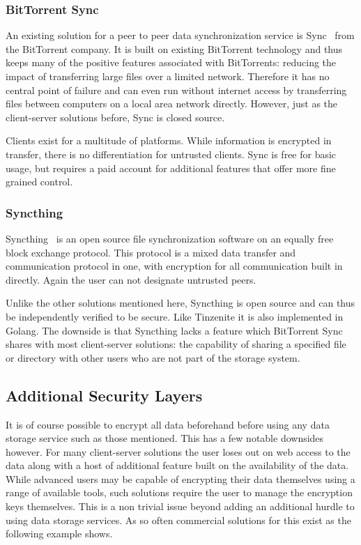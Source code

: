 \subsubsection{BitTorrent Sync}
\label{subs:BitTorrent Sync}

An existing solution for a peer to peer data synchronization service is Sync~\cite{web:site:bittorrent_sync} from the BitTorrent company.
It is built on existing BitTorrent technology and thus keeps many of the positive features associated with BitTorrents: reducing the impact of transferring large files over a limited network.
Therefore it has no central point of failure and can even run without internet access by transferring files between computers on a local area network directly.
However, just as the client-server solutions before, Sync is closed source.

Clients exist for a multitude of platforms.
While information is encrypted in transfer, there is no differentiation for untrusted clients.
Sync is free for basic usage, but requires a paid account for additional features that offer more fine grained control.

\subsubsection{Syncthing}
\label{subs:Syncthing}

Syncthing~\cite{web:site:synthing} is an open source file synchronization software on an equally free block exchange protocol.
This protocol is a mixed data transfer and communication protocol in one, with encryption for all communication built in directly.
Again the user can not designate untrusted peers.

Unlike the other solutions mentioned here, Syncthing is open source and can thus be independently verified to be secure.
Like Tinzenite it is also implemented in Golang.
The downside is that Syncthing lacks a feature which BitTorrent Sync shares with most client-server solutions: the capability of sharing a specified file or directory with other users who are not part of the storage system.

\subsection{Additional Security Layers}
\label{sub:Additional Security Layers}

It is of course possible to encrypt all data beforehand before using any data storage service such as those mentioned.
This has a few notable downsides however.
For many client-server solutions the user loses out on web access to the data along with a host of additional feature built on the availability of the data.
While advanced users may be capable of encrypting their data themselves using a range of available tools, such solutions require the user to manage the encryption keys themselves.
This is a non trivial issue beyond adding an additional hurdle to using data storage services.
As so often commercial solutions for this exist as the following example shows.

